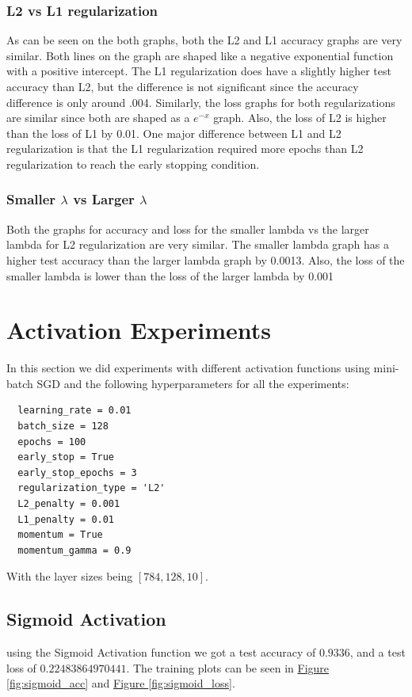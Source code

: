\documentclass{article}
\begin{document}
\subsubsection{L2 vs L1 regularization}
As can be seen on the both graphs, both the L2 and L1 accuracy graphs are very similar. Both lines on the graph are shaped like a 
negative exponential function with a positive intercept. 
The L1 regularization does have a slightly higher test accuracy than L2, but the difference is not significant since the accuracy difference is only around .004. Similarly, the loss graphs for both regularizations are 
similar since both are shaped as a $e^{-x}$ graph. Also, the
loss of L2 is higher than the loss of L1 by 0.01. One major difference between L1 and L2 regularization is that the L1 regularization required more epochs than
L2 regularization to reach the early stopping condition.

\subsubsection{Smaller $\lambda$ vs Larger $\lambda$}
Both the graphs for accuracy and loss for the smaller lambda vs the larger lambda for 
L2 regularization are very similar. The smaller lambda graph 
has a higher test accuracy than the larger lambda graph by 0.0013.  Also, the loss of 
the smaller lambda is lower than the loss of the larger lambda by 0.001

\section{Activation Experiments}
In this section we did experiments with different activation functions
using mini-batch SGD and the following hyperparameters for all the experiments:
\begin{verbatim}
  learning_rate = 0.01
  batch_size = 128
  epochs = 100
  early_stop = True
  early_stop_epochs = 3
  regularization_type = 'L2'
  L2_penalty = 0.001
  L1_penalty = 0.01
  momentum = True
  momentum_gamma = 0.9
\end{verbatim}
With the layer sizes being $[784, 128, 10]$.

\subsection{Sigmoid Activation}
using the Sigmoid Activation function we got a test accuracy of $0.9336$, and 
a test loss of $0.22483864970441$. The training plots can be seen in
\hyperref[fig:sigmoid_acc]{Figure \ref{fig:sigmoid_acc}} and
\hyperref[fig:sigmoid_loss]{Figure \ref{fig:sigmoid_loss}}.
\end{document}

